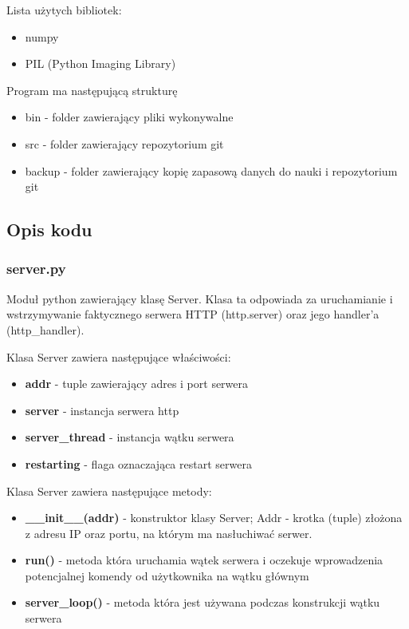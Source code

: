 \documentclass{article}
\begin{document}
Lista użytych bibliotek:
\begin{itemize}
    \item numpy
    \item PIL (Python Imaging Library)
\end{itemize}



Program ma następującą strukturę
\begin{itemize}
    \item bin - folder zawierający pliki wykonywalne
    \item src - folder zawierający repozytorium git
    \item backup - folder zawierający kopię zapasową danych do nauki i repozytorium git
\end{itemize}

\subsection{Opis kodu}
\subsubsection{server.py}
Moduł python zawierający klasę Server. Klasa ta odpowiada za uruchamianie i wstrzymywanie faktycznego serwera HTTP (http.server) oraz jego handler'a (http\_handler).

Klasa Server zawiera następujące właściwości:
\begin{itemize}
    \item \textbf{addr} - tuple zawierający adres i port serwera
    \item \textbf{server} - instancja serwera http
    \item \textbf{server\_thread} - instancja wątku serwera
    \item \textbf{restarting} - flaga oznaczająca restart serwera
\end{itemize}

Klasa Server zawiera następujące metody:
\begin{itemize}
    \item \textbf{\_\_init\_\_(addr)} - konstruktor klasy Server; Addr - krotka (tuple) złożona z adresu IP oraz portu, na którym ma nasłuchiwać serwer.
    \item \textbf{run()} - metoda która uruchamia wątek serwera i oczekuje wprowadzenia potencjalnej komendy od użytkownika na wątku głównym
    \item \textbf{server\_loop()} - metoda która jest używana podczas konstrukcji wątku serwera 
\end{itemize}
\end{document}
